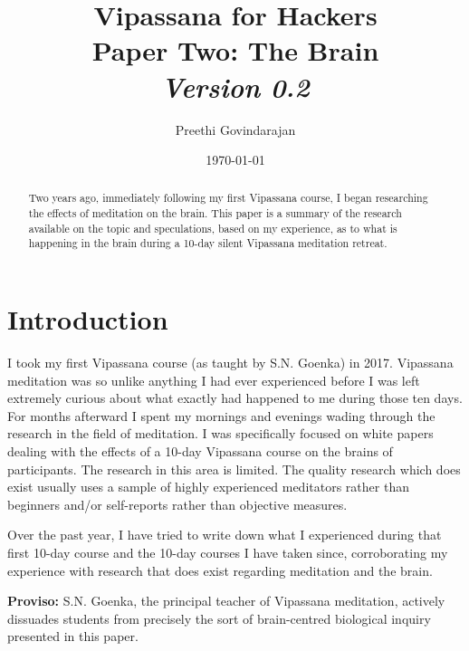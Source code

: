 \documentclass[a4paper, amsfonts, amssymb, amsmath, reprint, showkeys, nofootinbib, twoside]{revtex4-1}
\begin{document}
\title{%
  \large{Vipassana for Hackers} \\
  \Huge{Paper Two: The Brain} \\
  \large\textit{Version 0.2}
}
\author{Preethi Govindarajan}
\date{\today}

\begin{abstract}
  Two years ago, immediately following my first Vipassana course, I began researching
the effects of meditation on the brain. This paper is a summary of the research
available on the topic and speculations, based on my experience, as to what is
happening in the brain during a 10-day silent Vipassana meditation retreat.
\end{abstract}


\maketitle

\listoftodos

\section{Introduction}

I took my first Vipassana course (as taught by S.N. Goenka) in 2017.
Vipassana meditation was so unlike anything I had ever experienced before
I was left extremely curious about what exactly had happened
to me during those ten days. For months afterward I spent my mornings and
evenings wading through the research in the field of meditation. I was specifically
focused on white papers dealing with the effects of a 10-day Vipassana course on
the brains of participants. The research in this area is limited.
The quality research which does exist usually uses a sample of highly
experienced meditators \cite{tibetanmonks} rather than beginners and/or self-reports rather than
objective measures.

Over the past year, I have tried to write down what I experienced during that first
10-day course and the 10-day courses I have taken since, corroborating my experience
with research that does exist regarding meditation and the brain.

\textbf{Proviso:} S.N. Goenka, the principal teacher of Vipassana meditation,
actively dissuades students from precisely the sort of brain-centred biological
inquiry presented in this paper.
\end{document}
